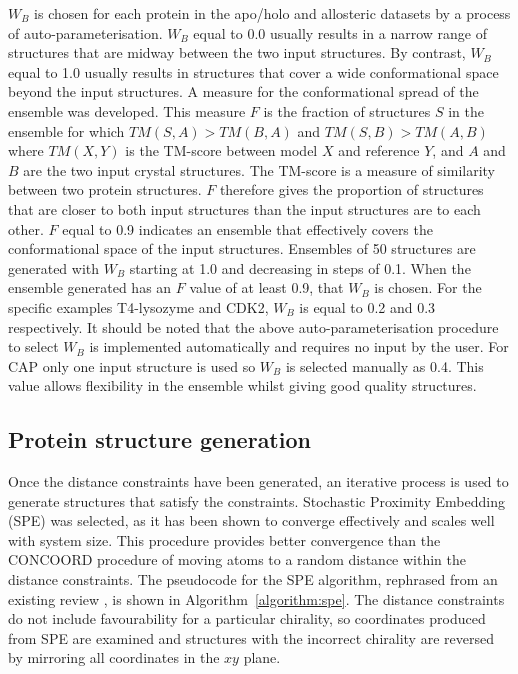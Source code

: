$W_{B}$ is chosen for each protein in the apo/holo and allosteric datasets by a process of auto-parameterisation.
$W_{B}$ equal to 0.0 usually results in a narrow range of structures that are midway between the two input structures.
By contrast, $W_{B}$ equal to 1.0 usually results in structures that cover a wide conformational space beyond the input structures.
A measure for the conformational spread of the ensemble was developed.
This measure $F$ is the fraction of structures $S$ in the ensemble for which $TM(S,A) > TM(B,A)$ and $TM(S,B) > TM(A,B)$ where $TM(X,Y)$ is the TM-score between model $X$ and reference $Y$, and $A$ and $B$ are the two input crystal structures.
The TM-score is a measure of similarity between two protein structures.
$F$ therefore gives the proportion of structures that are closer to both input structures than the input structures are to each other.
$F$ equal to 0.9 indicates an ensemble that effectively covers the conformational space of the input structures.
Ensembles of 50 structures are generated with $W_{B}$ starting at 1.0 and decreasing in steps of 0.1.
When the ensemble generated has an $F$ value of at least 0.9, that $W_{B}$ is chosen.
For the specific examples T4-lysozyme and CDK2, $W_{B}$ is equal to 0.2 and 0.3 respectively.
It should be noted that the above auto-parameterisation procedure to select $W_{B}$ is implemented automatically and requires no input by the user.
For CAP only one input structure is used so $W_{B}$ is selected manually as 0.4.
This value allows flexibility in the ensemble whilst giving good quality structures.


\subsection{Protein structure generation}

Once the distance constraints have been generated, an iterative process is used to generate structures that satisfy the constraints.
Stochastic Proximity Embedding (SPE) \cite{Agrafiotis2013} was selected, as it has been shown to converge effectively and scales well with system size.
This procedure provides better convergence than the CONCOORD procedure of moving atoms to a random distance within the distance constraints.
The pseudocode for the SPE algorithm, rephrased from an existing review \cite{Agrafiotis2013}, is shown in Algorithm~\ref{algorithm:spe}.
The distance constraints do not include favourability for a particular chirality, so coordinates produced from SPE are examined and structures with the incorrect chirality are reversed by mirroring all coordinates in the $xy$ plane.


